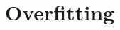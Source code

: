 \documentclass[11pt, oneside]{article}
\begin{document}
\vspace{-1em}
\begin{figure}[h!]
\centering
{}
\end{figure}

\section{Overfitting}

\vspace{-.5em}
\end{document}
